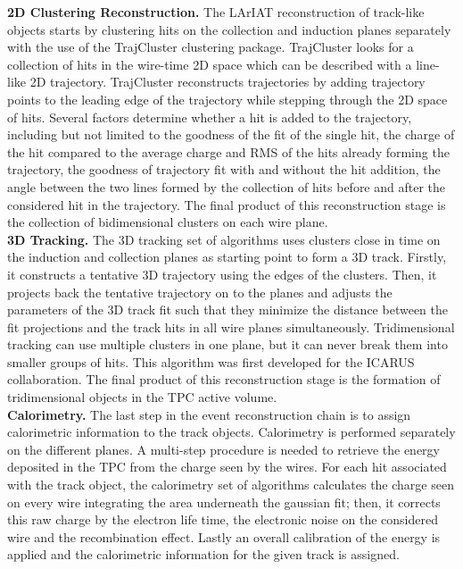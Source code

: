 \documentclass[aps,prl,twocolumn,showpacs,superscriptaddress,groupedaddress]{revtex4}  %
\begin{document}
\textbf{2D Clustering Reconstruction.} 
The LArIAT reconstruction of track-like objects starts by clustering hits on the collection and induction planes separately with the use of the TrajCluster clustering package\cite{Baller2016}. 
TrajCluster looks for a collection of hits in the wire-time 2D space which can be described with a line-like 2D trajectory. TrajCluster reconstructs trajectories by adding trajectory points to the leading edge of the trajectory while stepping through the 2D space of hits. Several factors determine whether a hit is added to the trajectory, including but not limited to the goodness of the fit of the single hit, the charge of the hit compared to the average charge and RMS of the hits already forming the trajectory, the goodness of trajectory fit with and without the hit addition, the angle between the two lines formed by the collection of hits before and after the considered hit in the trajectory.
The final product of this reconstruction stage is the collection of bidimensional clusters on each wire plane.\\%

\textbf{3D Tracking.} The 3D tracking set of algorithms uses clusters close in time on the induction and collection planes as starting point to form a 3D track. Firstly, it constructs a tentative 3D trajectory using the edges of the clusters. Then, it  projects back the tentative trajectory on to the planes and adjusts the parameters of the 3D track fit such that they minimize the distance between the fit projections and the track hits in all wire planes simultaneously.  Tridimensional tracking can use multiple clusters in one plane, but it can never break them into smaller groups of hits. This algorithm was first developed for the ICARUS collaboration\cite{Antonello2013}. The final product of this reconstruction stage is the formation of  tridimensional objects in the TPC active volume.\\%

\textbf{Calorimetry.} The last step in the event reconstruction chain is to assign calorimetric information to the track objects. Calorimetry is performed separately on the different planes. A multi-step procedure is needed to retrieve the energy deposited in the TPC  from the charge seen by the wires.
For each hit associated with the track object, the calorimetry set of algorithms calculates the charge seen on every wire integrating the area underneath the gaussian fit; then, it corrects this raw charge by the electron life time, the electronic noise on the considered wire and the recombination effect. Lastly an overall calibration of the energy is applied and the calorimetric information for the given track is assigned. \\
\end{document}
